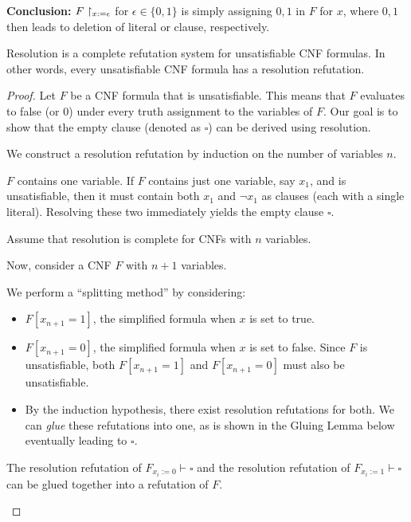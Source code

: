 \textbf{Conclusion:}  
$F\upharpoonright_{x := \epsilon}$ for $\epsilon \in \{0,1\}$ is simply assigning $0,1$ in $F$ for $x$, where $0,1$ then leads to deletion of literal or clause, respectively.




\begin{theorem}
Resolution is a complete refutation system for unsatisfiable CNF formulas. In other words, every unsatisfiable CNF formula has a resolution refutation. 
\end{theorem}

\begin{proof}
Let $F$ be a CNF formula that is unsatisfiable. This means that $F$ evaluates to false (or 0) under every truth assignment to the variables of $F$. Our goal is to show that the empty clause (denoted as $\square$) can be derived using resolution.

We construct a resolution refutation by induction on the number of variables $n$.

\Base $F$ contains one variable. 
If $F$ contains just one variable, say $x_1$, and is unsatisfiable, then it must contain both $x_1$ and $\neg x_1$ as clauses (each with a single literal).
Resolving these two immediately yields the empty clause $\square$.

\induction  Assume that resolution is complete for CNFs with $n$ variables.
    \item Now, consider a CNF $F$ with $n+1$ variables.
    \item We perform a ``splitting method'' by considering:
    \begin{itemize}
        \item $F[x_{n+1}=1]$, the simplified formula when $x$ is set to true.
        \item $F[x_{n+1}=0]$, the simplified formula when $x$ is set to false. Since $F$ is unsatisfiable, both $F[x_{n+1}=1]$ and $F[x_{n+1}=0]$ must also be unsatisfiable.
        \item By the induction hypothesis, there exist resolution refutations for both. We can \emph{glue} these refutations into one, as is shown in the Gluing Lemma below eventually leading to $\square$.
    \end{itemize}
 
  
 
 

\begin{lemma}
\label{lem:glueing-no-width}
The resolution refutation of $F_{x_i := 0} \vdash \square$ and the resolution refutation of $F_{x_i := 1} \vdash \square$ can be glued together into a refutation of $F$.


\end{lemma}
\end{proof}
